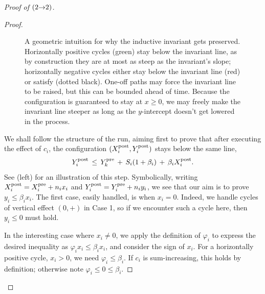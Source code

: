 \begin{proof}[Proof of  $({2}{\rightarrow}{2})$]
\begin{proof}
\begin{figure}[t]
\caption{
    A geometric intuition for why the inductive invariant gets preserved.
    \figleft Horizontally positive cycles (green) stay below the invariant line,
    as by construction they are at most as steep as the invariant's slope;
    horizontally negative cycles either stay below the invariant line (red)
    or satisfy  (dotted black).
    \figcenter One-off paths may force the invariant line to be raised,
    but this can be bounded ahead of time. 
    \figright Because the configuration is guaranteed to stay at $x \geq 0$,
    we may freely make the invariant line steeper as long as the $y$-intercept
    doesn't get lowered in the process.
}
\label{fig:induction}
\end{figure}
We shall follow the structure of the run, aiming first to prove
that after executing the effect of $c_i$, the configuration
$(X^{\mathrm{post}}_i, Y^{\mathrm{post}}_i)$ stays below the same line, \ie
\begin{equation} \label{eq:steep-ind-post}
    Y^{\mathrm{post}}_i \, \leq \, Y^{\mathrm{pre}}_k \, + \, S_i (1 + \beta_i) \, + \, \beta_i X^{\mathrm{post}}_i.
\end{equation}
See  (left) for an illustration of this step.
Symbolically, writing $X^{\mathrm{post}}_i = X^{\mathrm{pre}}_i + n_i x_i$ and $Y^{\mathrm{post}}_i = Y^{\mathrm{pre}}_i + n_i y_i$, we see that
our aim is to prove $y_i \leq \beta_i x_i$.
The first case, easily handled, is when $x_i = 0$. Indeed, we handle cycles of vertical effect
$(0, +)$ in Case 1, so if we encounter such a cycle here, then $y_i \leq 0$ must hold.

In the interesting case where $x_i \neq 0$, we apply the definition
of $\varphi_i$ to express the desired inequality as $\varphi_i x_i \leq \beta_i x_i$,
and consider the sign of $x_i$.
For a horizontally positive cycle, \ie $x_i > 0$, we need $\varphi_i \leq \beta_i$.
If $c_i$ is sum-increasing, this holds by definition;
otherwise note $\varphi_i \leq 0 \leq \beta_i$.


\end{proof}
\end{proof}
